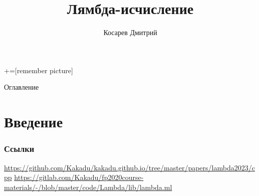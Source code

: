 \documentclass[aspectratio=169
  , xcolor={svgnames}
  , hyperref=
      { colorlinks
      , urlcolor=DarkBlue
      }
  , russian  %
  ]{beamer}
\title[]{Лямбда-исчисление}
\author{Косарев Дмитрий}
\begin{document}
\maketitle

+=[remember picture]

\everymath{\displaystyle}

\begin{frame}{Оглавление}
  \tableofcontents
\end{frame}


\section*{Введение}


\begin{frame}%
  \frametitle<presentation>{Ссылки}
  \begin{thebibliography}{10}
     \url{https://github.com/Kakadu/kakadu.github.io/tree/master/papers/lambda2023/cpp}
     \url{https://gitlab.com/Kakadu/fp2020course-materials/-/blob/master/code/Lambda/lib/lambda.ml}
  \end{thebibliography}
\end{frame}

\appendix


\end{document}
